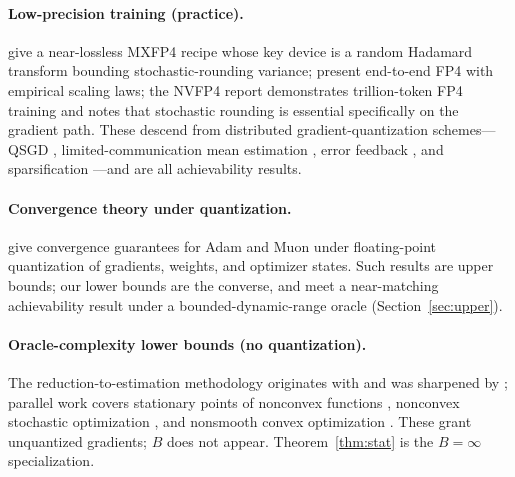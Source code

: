\documentclass[11pt]{article}
\theoremstyle{definition}
\begin{document}
\paragraph{Low-precision training (practice).} \citet{tseng2025mxfp4} give a near-lossless MXFP4
recipe whose key device is a random Hadamard transform bounding stochastic-rounding variance;
\citet{castro2025quartet} present end-to-end FP4 with empirical scaling laws; the NVFP4 report
\citep{nvidia2025nvfp4} demonstrates trillion-token FP4 training and notes that stochastic rounding is
essential specifically on the gradient path. These descend from distributed gradient-quantization
schemes---QSGD \citep{alistarh2017qsgd}, limited-communication mean estimation \citep{suresh2017dme},
error feedback \citep{karimireddy2019errorfeedback}, and sparsification
\citep{stich2018sparsified,wangni2018gradient}---and are all achievability results.

\paragraph{Convergence theory under quantization.} \citet{tang2025adaptive} give convergence
guarantees for Adam and Muon under floating-point quantization of gradients, weights, and optimizer
states. Such results are upper bounds; our lower bounds are the converse, and meet a near-matching
achievability result under a bounded-dynamic-range oracle (Section~\ref{sec:upper}).

\paragraph{Oracle-complexity lower bounds (no quantization).} The reduction-to-estimation methodology
originates with \citet{nemirovski1983problem} and was sharpened by \citet{agarwal2012lower}; parallel
work covers stationary points of nonconvex functions \citep{carmon2020stationary}, nonconvex
stochastic optimization \citep{arjevani2023nonconvex}, and nonsmooth convex optimization
\citep{braun2017nonsmooth}. These grant unquantized gradients; $B$ does not appear.
Theorem~\ref{thm:stat} is the $B=\infty$ specialization.
\end{document}
